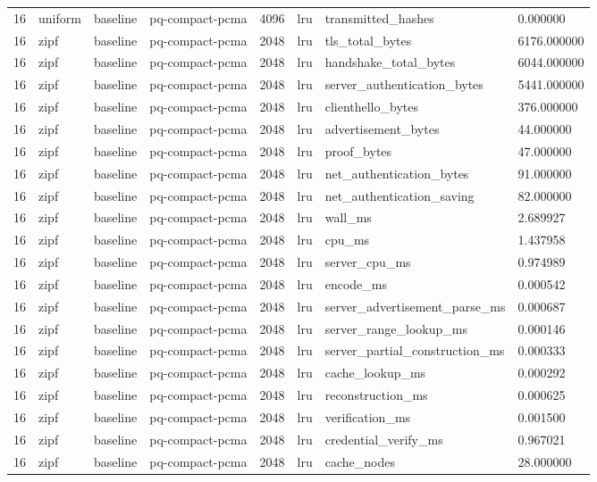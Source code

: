 \begin{tabular}{llllllll}
16 & uniform & baseline & pq-compact-pcma & 4096 & lru & transmitted\_hashes & 0.000000 \\
16 & zipf & baseline & pq-compact-pcma & 2048 & lru & tls\_total\_bytes & 6176.000000 \\
16 & zipf & baseline & pq-compact-pcma & 2048 & lru & handshake\_total\_bytes & 6044.000000 \\
16 & zipf & baseline & pq-compact-pcma & 2048 & lru & server\_authentication\_bytes & 5441.000000 \\
16 & zipf & baseline & pq-compact-pcma & 2048 & lru & clienthello\_bytes & 376.000000 \\
16 & zipf & baseline & pq-compact-pcma & 2048 & lru & advertisement\_bytes & 44.000000 \\
16 & zipf & baseline & pq-compact-pcma & 2048 & lru & proof\_bytes & 47.000000 \\
16 & zipf & baseline & pq-compact-pcma & 2048 & lru & net\_authentication\_bytes & 91.000000 \\
16 & zipf & baseline & pq-compact-pcma & 2048 & lru & net\_authentication\_saving & 82.000000 \\
16 & zipf & baseline & pq-compact-pcma & 2048 & lru & wall\_ms & 2.689927 \\
16 & zipf & baseline & pq-compact-pcma & 2048 & lru & cpu\_ms & 1.437958 \\
16 & zipf & baseline & pq-compact-pcma & 2048 & lru & server\_cpu\_ms & 0.974989 \\
16 & zipf & baseline & pq-compact-pcma & 2048 & lru & encode\_ms & 0.000542 \\
16 & zipf & baseline & pq-compact-pcma & 2048 & lru & server\_advertisement\_parse\_ms & 0.000687 \\
16 & zipf & baseline & pq-compact-pcma & 2048 & lru & server\_range\_lookup\_ms & 0.000146 \\
16 & zipf & baseline & pq-compact-pcma & 2048 & lru & server\_partial\_construction\_ms & 0.000333 \\
16 & zipf & baseline & pq-compact-pcma & 2048 & lru & cache\_lookup\_ms & 0.000292 \\
16 & zipf & baseline & pq-compact-pcma & 2048 & lru & reconstruction\_ms & 0.000625 \\
16 & zipf & baseline & pq-compact-pcma & 2048 & lru & verification\_ms & 0.001500 \\
16 & zipf & baseline & pq-compact-pcma & 2048 & lru & credential\_verify\_ms & 0.967021 \\
16 & zipf & baseline & pq-compact-pcma & 2048 & lru & cache\_nodes & 28.000000 \\

\end{tabular}

